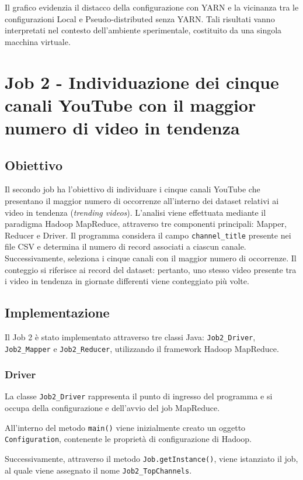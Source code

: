 \documentclass[12pt, a4paper]{article}
\begin{document}
Il grafico evidenzia il distacco della configurazione
con YARN e la vicinanza tra le configurazioni Local
e Pseudo-distributed senza YARN.
Tali risultati vanno interpretati nel contesto
dell'ambiente sperimentale, costituito da una singola
macchina virtuale.

\section{Job 2 - Individuazione dei cinque canali YouTube con il maggior numero di video in tendenza}
\subsection{Obiettivo}
Il secondo job ha l'obiettivo di individuare i cinque canali YouTube che presentano il maggior numero di occorrenze all'interno dei dataset relativi ai video in tendenza (\textit{trending videos}).
L'analisi viene effettuata mediante il paradigma Hadoop MapReduce, attraverso tre componenti principali: Mapper, Reducer e Driver.
Il programma considera il campo \texttt{channel\_title} presente nei file CSV e determina il numero di record associati a ciascun canale. Successivamente, seleziona i cinque canali con il maggior numero di occorrenze.
Il conteggio si riferisce ai record del dataset: pertanto, uno stesso video presente tra i video in tendenza in giornate differenti viene conteggiato più volte.

\subsection{Implementazione}

Il Job 2 è stato implementato attraverso tre classi Java:
\texttt{Job2\_Driver}, \texttt{Job2\_Mapper} e
\texttt{Job2\_Reducer}, utilizzando il framework
Hadoop MapReduce.

\subsubsection{Driver}

La classe \texttt{Job2\_Driver} rappresenta il punto
di ingresso del programma e si occupa della
configurazione e dell'avvio del job MapReduce.

All'interno del metodo \texttt{main()} viene
inizialmente creato un oggetto \texttt{Configuration},
contenente le proprietà di configurazione di Hadoop.

Successivamente, attraverso il metodo
\texttt{Job.getInstance()}, viene istanziato
il job, al quale viene assegnato il nome
\texttt{Job2\_TopChannels}.
\end{document}
